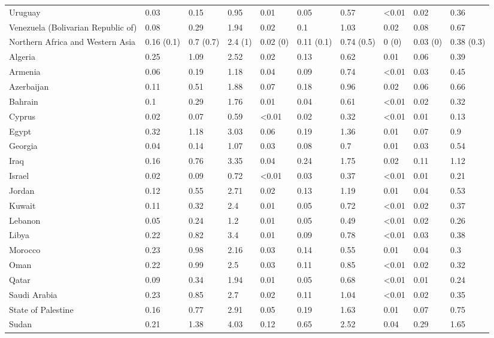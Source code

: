 \begin{longtable}[t]{llllllllll}
Uruguay & 0.03 & 0.15 & 0.95 & 0.01 & 0.05 & 0.57 & <0.01 & 0.02 & 0.36\\
Venezuela (Bolivarian Republic of) & 0.08 & 0.29 & 1.94 & 0.02 & 0.1 & 1.03 & 0.02 & 0.08 & 0.67\\
\addlinespace
Northern Africa and Western Asia & 0.16 (0.1) & 0.7 (0.7) & 2.4 (1) & 0.02 (0) & 0.11 (0.1) & 0.74 (0.5) & 0 (0) & 0.03 (0) & 0.38 (0.3)\\
Algeria & 0.25 & 1.09 & 2.52 & 0.02 & 0.13 & 0.62 & 0.01 & 0.06 & 0.39\\
Armenia & 0.06 & 0.19 & 1.18 & 0.04 & 0.09 & 0.74 & <0.01 & 0.03 & 0.45\\
Azerbaijan & 0.11 & 0.51 & 1.88 & 0.07 & 0.18 & 0.96 & 0.02 & 0.06 & 0.66\\
Bahrain & 0.1 & 0.29 & 1.76 & 0.01 & 0.04 & 0.61 & <0.01 & 0.02 & 0.32\\
\addlinespace
Cyprus & 0.02 & 0.07 & 0.59 & <0.01 & 0.02 & 0.32 & <0.01 & 0.01 & 0.13\\
Egypt & 0.32 & 1.18 & 3.03 & 0.06 & 0.19 & 1.36 & 0.01 & 0.07 & 0.9\\
Georgia & 0.04 & 0.14 & 1.07 & 0.03 & 0.08 & 0.7 & 0.01 & 0.03 & 0.54\\
Iraq & 0.16 & 0.76 & 3.35 & 0.04 & 0.24 & 1.75 & 0.02 & 0.11 & 1.12\\
Israel & 0.02 & 0.09 & 0.72 & <0.01 & 0.03 & 0.37 & <0.01 & 0.01 & 0.21\\
\addlinespace
Jordan & 0.12 & 0.55 & 2.71 & 0.02 & 0.13 & 1.19 & 0.01 & 0.04 & 0.53\\
Kuwait & 0.11 & 0.32 & 2.4 & 0.01 & 0.05 & 0.72 & <0.01 & 0.02 & 0.37\\
Lebanon & 0.05 & 0.24 & 1.2 & 0.01 & 0.05 & 0.49 & <0.01 & 0.02 & 0.26\\
Libya & 0.22 & 0.82 & 3.4 & 0.01 & 0.09 & 0.78 & <0.01 & 0.03 & 0.38\\
Morocco & 0.23 & 0.98 & 2.16 & 0.03 & 0.14 & 0.55 & 0.01 & 0.04 & 0.3\\
\addlinespace
Oman & 0.22 & 0.99 & 2.5 & 0.03 & 0.11 & 0.85 & <0.01 & 0.02 & 0.32\\
Qatar & 0.09 & 0.34 & 1.94 & 0.01 & 0.05 & 0.68 & <0.01 & 0.01 & 0.24\\
Saudi Arabia & 0.23 & 0.85 & 2.7 & 0.02 & 0.11 & 1.04 & <0.01 & 0.02 & 0.35\\
State of Palestine & 0.16 & 0.77 & 2.91 & 0.05 & 0.19 & 1.63 & 0.01 & 0.07 & 0.75\\
Sudan & 0.21 & 1.38 & 4.03 & 0.12 & 0.65 & 2.52 & 0.04 & 0.29 & 1.65\\

\end{longtable}
